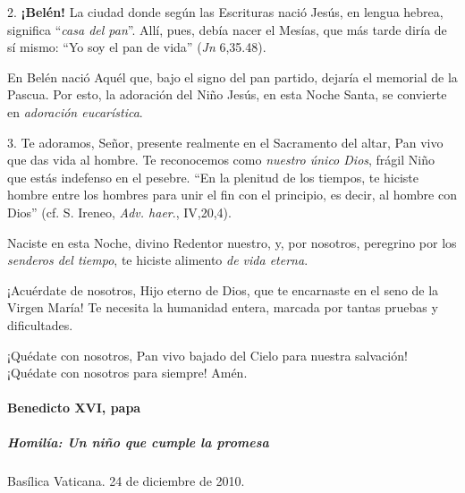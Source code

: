 \documentclass[]{article}
\let\oldparagraph\paragraph
\renewcommand{\paragraph}[1]{\oldparagraph{#1}\mbox{}}
\let\oldsubparagraph\subparagraph
\renewcommand{\subparagraph}[1]{\oldsubparagraph{#1}\mbox{}}
\begin{document}
2. \textbf{¡Belén!} La ciudad donde según las Escrituras nació Jesús, en
lengua hebrea, significa ``\emph{casa del pan}''. Allí, pues, debía
nacer el Mesías, que más tarde diría de sí mismo: ``Yo soy el pan de
vida'' (\emph{Jn} 6,35.48).

En Belén nació Aquél que, bajo el signo del pan partido, dejaría el
memorial de la Pascua. Por esto, la adoración del Niño Jesús, en esta
Noche Santa, se convierte en \emph{adoración eucarística}.

3. Te adoramos, Señor, presente realmente en el Sacramento del altar,
Pan vivo que das vida al hombre. Te reconocemos como \emph{nuestro único
Dios}, frágil Niño que estás indefenso en el pesebre. ``En la plenitud
de los tiempos, te hiciste hombre entre los hombres para unir el fin con
el principio, es decir, al hombre con Dios'' (cf. S. Ireneo, \emph{Adv.
haer}., IV,20,4).

Naciste en esta Noche, divino Redentor nuestro, y, por nosotros,
peregrino por los \emph{senderos del tiempo}, te hiciste alimento
\emph{de vida eterna}.

¡Acuérdate de nosotros, Hijo eterno de Dios, que te encarnaste en el
seno de la Virgen María! Te necesita la humanidad entera, marcada por
tantas pruebas y dificultades.

¡Quédate con nosotros, Pan vivo bajado del Cielo para nuestra salvación!
¡Quédate con nosotros para siempre! Amén.

\paragraph{Benedicto XVI, papa}\label{benedicto-xvi-papa-4}

\subparagraph{Homilía: Un niño que cumple la
promesa}\label{homiluxeda-un-niuxf1o-que-cumple-la-promesa}

Basílica Vaticana. 24 de diciembre de 2010.
\end{document}
